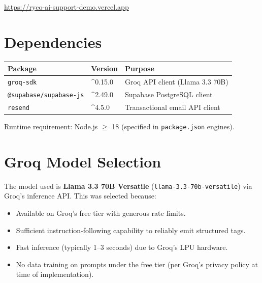 \documentclass[12pt, a4paper]{article}
\newcommand{\inlinecode}[1]{%
  \colorbox{inlinecode!20}{\texttt{\small #1}}%
}
\begin{document}
\begin{center}
  \large\url{https://ryco-ai-support-demo.vercel.app}
\end{center}

\appendix
\section{Dependencies}

\begin{center}
\begin{tabular}{lll}
\toprule
\textbf{Package} & \textbf{Version} & \textbf{Purpose} \\
\midrule
\texttt{groq-sdk} & \textasciicircum0.15.0 & Groq API client (Llama 3.3 70B) \\
\texttt{@supabase/supabase-js} & \textasciicircum2.49.0 & Supabase PostgreSQL client \\
\texttt{resend} & \textasciicircum4.5.0 & Transactional email API client \\
\bottomrule
\end{tabular}
\end{center}

Runtime requirement: Node.js $\geq$ 18 (specified in \inlinecode{package.json} engines).

\section{Groq Model Selection}

The model used is \textbf{Llama 3.3 70B Versatile} (\texttt{llama-3.3-70b-versatile})
via Groq's inference API. This was selected because:

\begin{itemize}[leftmargin=*]
  \item Available on Groq's free tier with generous rate limits.
  \item Sufficient instruction-following capability to reliably emit structured tags.
  \item Fast inference (typically 1--3 seconds) due to Groq's LPU hardware.
  \item No data training on prompts under the free tier (per Groq's privacy policy
        at time of implementation).
\end{itemize}
\end{document}
